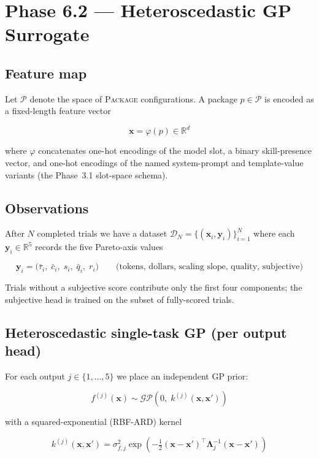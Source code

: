 \documentclass[11pt, letterpaper]{article}
\theoremstyle{definition}
\begin{document}
\section*{Phase 6.2 — Heteroscedastic GP Surrogate}

\subsection*{Feature map}

Let $\mathcal{P}$ denote the space of \textsc{Package} configurations.
A package $p \in \mathcal{P}$ is encoded as a fixed-length feature vector

\[
  \bm{x} = \varphi(p) \in \mathbb{R}^{d}
\]

where $\varphi$ concatenates one-hot encodings of the model slot, a binary
skill-presence vector, and one-hot encodings of the named system-prompt and
template-value variants (the Phase~3.1 slot-space schema).

\subsection*{Observations}

After $N$ completed trials we have a dataset
$\mathcal{D}_N = \{(\bm{x}_i, \bm{y}_i)\}_{i=1}^{N}$ where each
$\bm{y}_i \in \mathbb{R}^{5}$ records the five Pareto-axis values

\[
  \bm{y}_i =
  \bigl(
    \bar{\tau}_i,\;
    \bar{c}_i,\;
    s_i,\;
    \bar{q}_i,\;
    r_i
  \bigr)
  \qquad
  \text{(tokens, dollars, scaling slope, quality, subjective)}
\]

Trials without a subjective score contribute only the first four components;
the subjective head is trained on the subset of fully-scored trials.

\subsection*{Heteroscedastic single-task GP (per output head)}

For each output $j \in \{1,\ldots,5\}$ we place an independent GP prior:

\[
  f^{(j)}(\bm{x}) \sim \mathcal{GP}\!\left(0,\; k^{(j)}(\bm{x}, \bm{x}')\right)
\]

with a squared-exponential (RBF-ARD) kernel

\[
  k^{(j)}(\bm{x}, \bm{x}') =
  \sigma_{f,j}^{2} \exp\!\left(
    -\tfrac{1}{2}(\bm{x} - \bm{x}')^{\top}
    \bm{\Lambda}_j^{-1}
    (\bm{x} - \bm{x}')
  \right)
\]
\end{document}
